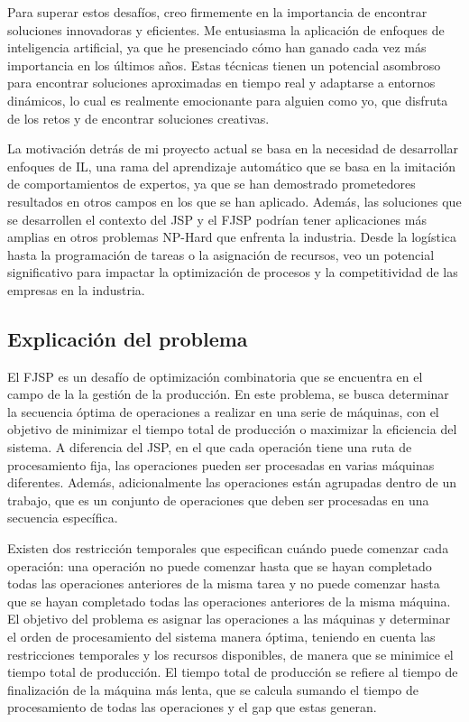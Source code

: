 Para superar estos desafíos, creo firmemente en la importancia de encontrar soluciones innovadoras y eficientes. 
Me entusiasma la aplicación de enfoques de inteligencia artificial, ya que he presenciado cómo han ganado 
cada vez más importancia en los últimos años. Estas técnicas tienen un potencial asombroso para encontrar 
soluciones aproximadas en tiempo real y adaptarse a entornos dinámicos, lo cual es realmente emocionante 
para alguien como yo, que disfruta de los retos y de encontrar soluciones creativas.\medskip

La motivación detrás de mi proyecto actual se basa en la necesidad de desarrollar enfoques de IL,
una rama del aprendizaje automático que se basa en la imitación de comportamientos de expertos,
ya que se han demostrado prometedores resultados en otros campos en los que se han aplicado. 
Además, las soluciones que se desarrollen el contexto del JSP y el FJSP podrían tener aplicaciones 
más amplias en otros problemas NP-Hard que enfrenta la industria. Desde la logística hasta la 
programación de tareas o la asignación de recursos, veo un potencial significativo 
para impactar la optimización de procesos y la competitividad de las empresas en la industria.

\subsection{Explicación del problema}
El FJSP es un desafío de optimización combinatoria que se encuentra en el campo de la la gestión de la 
producción. En este problema, se busca determinar la secuencia óptima de operaciones a realizar en una 
serie de máquinas, con el objetivo de minimizar el tiempo total de producción o maximizar la eficiencia 
del sistema. A diferencia del JSP, en el que cada operación tiene una ruta de procesamiento fija, 
las operaciones pueden ser procesadas en varias máquinas diferentes. Además, adicionalmente las 
operaciones están agrupadas dentro de un trabajo, que es un conjunto de operaciones que deben 
ser procesadas en una secuencia específica.\medskip

Existen dos restricción temporales que especifican cuándo puede comenzar 
cada operación: una operación no puede comenzar hasta que se hayan completado todas las operaciones
anteriores de la misma tarea y no puede comenzar hasta que se hayan completado todas las operaciones
anteriores de la misma máquina. El objetivo del problema es asignar las operaciones a las máquinas y determinar el orden de procesamiento 
del sistema manera óptima, teniendo en cuenta las restricciones temporales y los recursos disponibles, 
de manera que se minimice el tiempo total de producción. El tiempo total de producción se refiere al
tiempo de finalización de la máquina más lenta, que se calcula sumando el tiempo de procesamiento 
de todas las operaciones y el gap que estas generan.\medskip

